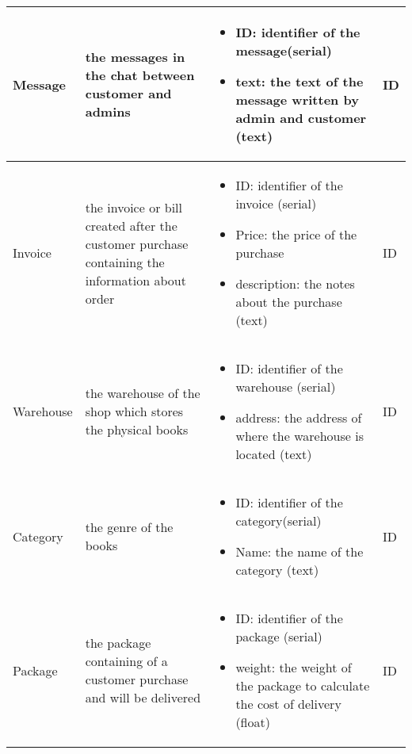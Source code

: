 \begin{longtable}{|p{}|p{} |p{}|p{} |}
   Message & the messages in the chat between customer and admins & \begin{itemize}
        \vspace{-1em}
        \item ID: identifier of the message(serial)
        \item text: the text of the message written by admin and customer (text)
    \end{itemize}
 &  ID \\\hline
 
   Invoice & the invoice or bill created after the customer purchase containing the information about order  & \begin{itemize}
        \vspace{-1em}
        \item ID: identifier of the invoice (serial)
        \item Price: the price of the purchase
        \item description: the notes about the purchase (text)
    \end{itemize}
 &  ID \\\hline
 
   Warehouse & the warehouse of the shop which stores the physical books & \begin{itemize}
        \vspace{-1em}
        \item ID: identifier of the warehouse (serial)
        \item address: the address of where the warehouse is located (text)
    \end{itemize}
 &  ID \\\hline
 
   Category & the genre of the books & \begin{itemize}
        \vspace{-1em}
        \item ID: identifier of the category(serial)
        \item Name: the name of the category (text)
    \end{itemize}
 &  ID \\\hline
 
   Package & the package containing of a customer purchase and will be delivered & \begin{itemize}
        \vspace{-1em}
        \item ID: identifier of the package (serial)
        \item weight: the weight of the package to calculate the cost of delivery (float)
    \end{itemize}
 &  ID \\\hline
 

\end{longtable}
